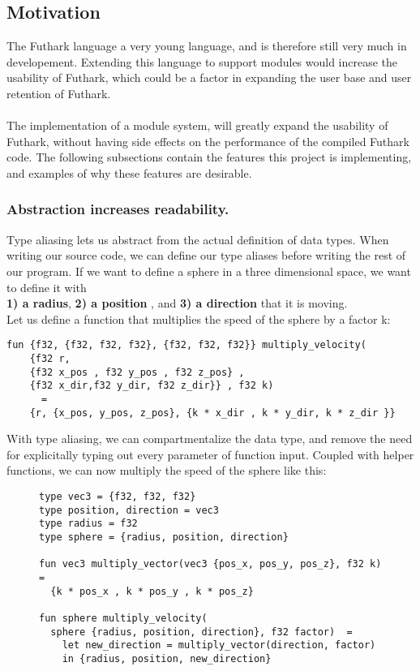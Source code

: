 \pagebreak
\subsection{Motivation}
\label{subsec:label}
The Futhark language a very young language, and is therefore still very much in
developement.
Extending this language to support modules would increase the usability of
Futhark, which could be a factor in expanding the user base and user retention
of Futhark.
\\
\\
The implementation of a module system, will greatly expand the usability of
Futhark, without having side effects on the performance of the compiled Futhark code.
The following subsections contain the features this project is implementing, and
examples of why these features are desirable.
\subsubsection{Abstraction increases readability.} 
Type aliasing lets us abstract from the actual definition of data types.
When writing our source code, we can define our type aliases before writing the
rest of our program.
If we want to define a sphere in a three dimensional space, we want to define it
with \\
\textbf{1) a radius}, \textbf{2) a position} , and \textbf{3) a direction} that it is
moving.\\
Let us define a function that multiplies the speed of the sphere by a factor k:
\begin{lstlisting}
fun {f32, {f32, f32, f32}, {f32, f32, f32}} multiply_velocity(
	{f32 r, 
	{f32 x_pos , f32 y_pos , f32 z_pos} , 
	{f32 x_dir,f32 y_dir, f32 z_dir}} , f32 k) 
	  =
    {r, {x_pos, y_pos, z_pos}, {k * x_dir , k * y_dir, k * z_dir }}
\end{lstlisting}
\noindent
With type aliasing, we can compartmentalize the data type, and remove the need
for explicitally typing out every parameter of function input.
Coupled with helper functions, we can now multiply the speed of the sphere like
this:
\begin{figure}
\begin{verbatim}
type vec3 = {f32, f32, f32}
type position, direction = vec3 
type radius = f32
type sphere = {radius, position, direction}

fun vec3 multiply_vector(vec3 {pos_x, pos_y, pos_z}, f32 k) =
  {k * pos_x , k * pos_y , k * pos_z}

fun sphere multiply_velocity(
  sphere {radius, position, direction}, f32 factor)  =
    let new_direction = multiply_vector(direction, factor)
    in {radius, position, new_direction}
\end{verbatim}
\end{figure}

